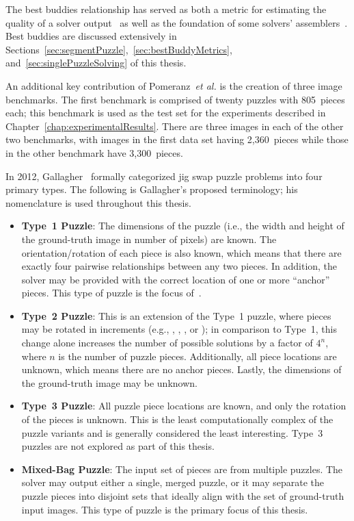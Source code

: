 The best buddies relationship has served as both a metric for estimating the quality of a solver output~\cite{sholomon2013} as well as the foundation of some solvers' assemblers~\cite{paikin2015}.  Best buddies are discussed extensively in Sections~\ref{sec:segmentPuzzle},~\ref{sec:bestBuddyMetrics}, and~\ref{sec:singlePuzzleSolving} of this thesis.

An additional key contribution of Pomeranz~\textit{et al.} is the creation of three image benchmarks.  The first benchmark is comprised of twenty puzzles with 805~pieces each; this benchmark is used as the test set for the experiments described in Chapter~\ref{chap:experimentalResults}. There are three images in each of the other two benchmarks, with images in the first data set having 2,360~pieces while those in the other benchmark have 3,300~pieces.

In 2012, Gallagher~\cite{gallagher2012} formally categorized jig swap puzzle problems into four primary types.  The following is Gallagher's proposed terminology; his nomenclature is used throughout this thesis.

\begin{itemize}

	\item \textbf{Type~1 Puzzle}: The dimensions of the puzzle (i.e., the width and height of the ground-truth image in number of pixels) are known.  The orientation/rotation of each piece is also known, which means that there are exactly four pairwise relationships between any two pieces.  In addition, the solver may be provided with the correct location of one or more ``anchor'' pieces.  This type of puzzle is the focus of~\cite{cho2010, pomeranz2011}.
	
	\item \textbf{Type~2 Puzzle}: This is an extension of the Type~1 puzzle, where pieces may be rotated in  increments (e.g., , , , or ); in comparison to Type~1, this change alone increases the number of possible solutions by a factor of $4^n$, where $n$ is the number of puzzle pieces.  Additionally, all piece locations are unknown, which means there are no anchor pieces.  Lastly, the dimensions of the ground-truth image may be unknown.
	
	\item \textbf{Type~3 Puzzle}: All puzzle piece locations are known, and only the rotation of the pieces is unknown.  This is the least computationally complex of the puzzle variants and is generally considered the least interesting.  Type~3 puzzles are not explored as part of this thesis.
	
	\item \textbf{Mixed-Bag Puzzle}: The input set of pieces are from multiple puzzles.  The solver may output either a single, merged puzzle, or it may separate the puzzle pieces into disjoint sets that ideally align with the set of ground-truth input images.  This type of puzzle is the primary focus of this thesis.

\end{itemize}

